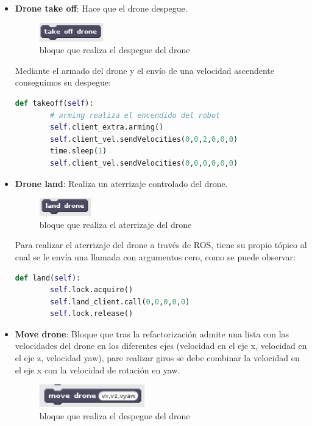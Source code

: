 \begin{itemize}
\begin{itemize}
\begin{lstlisting}[language=python,firstnumber=1]
\end{lstlisting}

	\item \textbf{Drone take off}: Hace que el drone despegue.\\
	\begin{figure}[H]
     		\centering
     		\includegraphics[scale=1.2]{img/block-takeoff.png}
     		\caption{bloque que realiza el despegue del drone}
  		\label{fig:listas}
  				\end{figure}
  				
Mediante el armado del drone y el envío de una velocidad ascendente conseguimos su despegue:\\

 \begin{lstlisting}[language=python,firstnumber=1]
    def takeoff(self):
    	# arming realiza el encendido del robot
        self.client_extra.arming()
        self.client_vel.sendVelocities(0,0,2,0,0,0)
        time.sleep(1)
        self.client_vel.sendVelocities(0,0,0,0,0,0)
\end{lstlisting}

	\item \textbf{Drone land}: Realiza un aterrizaje controlado del drone.\\
	\begin{figure}[H]
     		\centering
     		\includegraphics[scale=1.2]{img/block-land.png}
     		\caption{bloque que realiza el aterrizaje del drone}
  		\label{fig:listas}
  				\end{figure}
Para realizar el aterrizaje del drone a través de ROS, tiene su propio tópico al cual se le envía una llamada con argumentos cero, como se puede observar:\\

 \begin{lstlisting}[language=python,firstnumber=1]
    def land(self):
        self.lock.acquire()
        self.land_client.call(0,0,0,0,0)
        self.lock.release()
\end{lstlisting}
	

	\item \textbf{Move drone}: Bloque que tras la refactorización admite una lista con las velocidades del drone en los diferentes ejes (velocidad en el eje x, velocidad en el eje z, velocidad yaw), pare realizar giros se debe combinar la velocidad en el eje x con la velocidad de rotación en yaw.\\
	\begin{figure}[H]
     		\centering
     		\includegraphics[scale=1.2]{img/block-move-drone.png}
     		\caption{bloque que realiza el despegue del drone}
  		\label{fig:listas}
  	\end{figure}
  	

\end{itemize}
\end{itemize}
